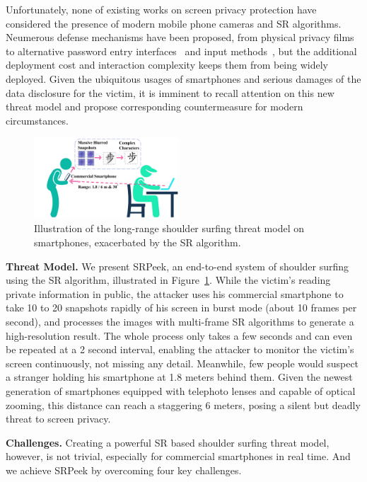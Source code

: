 Unfortunately, none of existing works on screen privacy protection have considered the presence of modern mobile phone cameras and SR algorithms. Neumerous defense mechanisms have been proposed, from physical privacy films to alternative password entry interfaces~\cite{wiedenbeck2006design,papadopoulos2017illusionpin} and input methods~\cite{kumar2007reducing}, but the additional deployment cost and interaction complexity keeps them from being widely deployed\cite{Chun2019Keep}. Given the ubiquitous usages of smartphones and serious damages of the data disclosure for the victim, it is imminent to recall attention on this new threat model and propose corresponding countermeasure for modern circumstances.

\begin{figure}
	\centering
	\includegraphics[width=0.48\textwidth]{pic/illustration.pdf}
    \caption{Illustration of the long-range shoulder surfing threat model on smartphones, exacerbated by the SR algorithm.}
	\label{overview}
\end{figure}

\vspace{1mm}
\noindent
\textbf{Threat Model.} We present \textsf{SRPeek}, an end-to-end system of shoulder surfing using the SR algorithm, illustrated in Figure~\ref{overview}. 
While the victim's reading private information in public, the attacker uses his commercial smartphone to take 10 to 20 snapshots rapidly of his screen in burst mode (about 10 frames per second), and processes the images with multi-frame SR algorithms to generate a high-resolution result. The whole process only takes a few seconds and can even be repeated at a 2 second interval, enabling the attacker to monitor the victim's screen continuously, not missing any detail. Meanwhile, few people would suspect a stranger holding his smartphone at 1.8 meters behind them. Given the newest generation of smartphones equipped with telephoto lenses and capable of optical zooming, this distance can reach a staggering 6 meters, posing a silent but deadly threat to screen privacy.

\vspace{1mm}
\noindent
\textbf{Challenges.} Creating a powerful SR based shoulder surfing threat model, however, is not trivial, especially for commercial smartphones in real time. And we achieve \textsf{SRPeek} by overcoming four key challenges.

